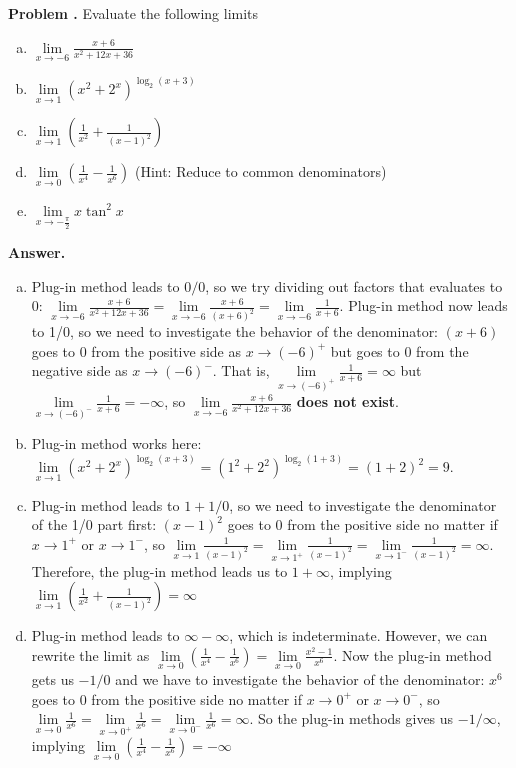 \documentclass[11pt,letterpaper]{article}
\newcounter{problem}
\newcommand{\problem}{
	\stepcounter{problem}%
	\noindent \textbf{Problem \theproblem. }%
}
\newcommand{\answer}{\noindent \textbf{Answer. }}
\begin{document}
\problem Evaluate the following limits
\begin{enumerate}[(a)]
    \item $\lim\limits_{x \to -6} \frac{x+6}{x^2+12x+36}$
    \item $\lim\limits_{x \to 1} (x^2+2^x)^{\log_{2}(x+3)}$
    \item $\lim\limits_{x \to 1} \left(\frac{1}{x^2} + \frac{1}{(x-1)^2}\right)$
    \item $\lim\limits_{x \to 0} \left(\frac{1}{x^4} - \frac{1}{x^6}\right)$ (Hint: Reduce to common denominators)
    \item $\lim\limits_{x \to -\frac{\pi}{2}} x \tan^2 x$
\end{enumerate}\vspace{6mm}

\answer
\begin{enumerate}[(a)]
    \item Plug-in method leads to $0/0$, so we try dividing out factors that evaluates to 0: $\lim\limits_{x \to -6} \frac{x+6}{x^2+12x+36} = \lim\limits_{x \to -6} \frac{x+6}{(x+6)^2} = \lim\limits_{x \to -6} \frac{1}{x+6}$.  Plug-in method now leads to 1/0, so we need to investigate the behavior of the denominator: $(x+6)$ goes to $0$ from the positive side as $x \rightarrow (-6)^+$ but goes to $0$ from the negative side as $x \rightarrow (-6)^-$.  That is, $\lim\limits_{x \to (-6)^+} \frac{1}{x+6} = \infty$ but $\lim\limits_{x \to (-6)^-} \frac{1}{x+6} = -\infty$, so $\lim\limits_{x \to -6} \frac{x+6}{x^2+12x+36}$ \textbf{does not exist}. 
    \item Plug-in method works here: $\lim\limits_{x \to 1} (x^2+2^x)^{\log_{2}(x+3)} = (1^2+2^2)^{\log_2(1+3)} = (1+2)^2 = 9$.
    \item Plug-in method leads to $1 + 1/0$, so we need to investigate the denominator of the 1/0 part first: $(x-1)^2$ goes to 0 from the positive side no matter if $x \rightarrow 1^+$ or $x \rightarrow 1^-$, so $\lim\limits_{x \to 1} \frac{1}{(x-1)^2} = \lim\limits_{x \to 1^+} \frac{1}{(x-1)^2} = \lim\limits_{x \to 1^-} \frac{1}{(x-1)^2} = \infty$.  Therefore, the plug-in method leads us to $1+\infty$, implying $\lim\limits_{x \to 1} \left(\frac{1}{x^2} + \frac{1}{(x-1)^2}\right) = \infty$
    \item Plug-in method leads to $\infty-\infty$, which is indeterminate.  However, we can rewrite the limit as $\lim\limits_{x \to 0} \left(\frac{1}{x^4} - \frac{1}{x^6}\right) = \lim\limits_{x \to 0} \frac{x^2-1}{x^6}$.  Now the plug-in method gets us $-1/0$ and we have to investigate the behavior of the denominator: $x^6$ goes to 0 from the positive side no matter if $x \rightarrow 0^+$ or $x \rightarrow 0^-$, so $\lim\limits_{x \to 0} \frac{1}{x^6} = \lim\limits_{x \to 0^+} \frac{1}{x^6} = \lim\limits_{x \to 0^-} \frac{1}{x^6} = \infty$.  So the plug-in methods gives us $-1/\infty$, implying $\lim\limits_{x \to 0} \left(\frac{1}{x^4} - \frac{1}{x^6}\right) = -\infty$

\end{enumerate}
\end{document}

